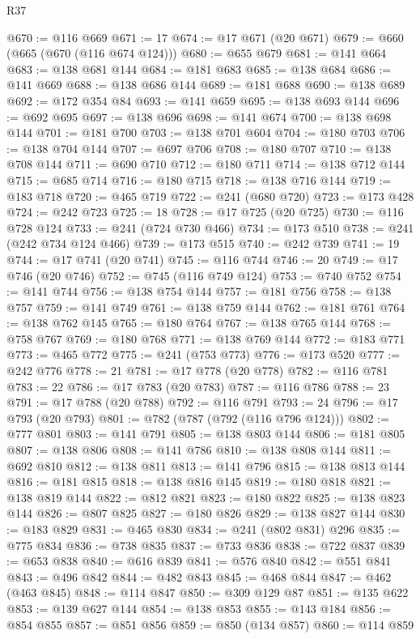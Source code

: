 \begin{lexlean}{R37}
\begin{coremodule}
@670 := @116 @669
@671 := 17
@674 := @17 @671 (@20 @671)
@679 := @660 (@665 (@670 (@116 @674 @124)))
@680 := @655 @679
@681 := @141 @664
@683 := @138 @681 @144
@684 := @181 @683
@685 := @138 @684
@686 := @141 @669
@688 := @138 @686 @144
@689 := @181 @688
@690 := @138 @689
@692 := @172 @354 @84
@693 := @141 @659
@695 := @138 @693 @144
@696 := @692 @695
@697 := @138 @696
@698 := @141 @674
@700 := @138 @698 @144
@701 := @181 @700
@703 := @138 @701 @604
@704 := @180 @703
@706 := @138 @704 @144
@707 := @697 @706
@708 := @180 @707
@710 := @138 @708 @144
@711 := @690 @710
@712 := @180 @711
@714 := @138 @712 @144
@715 := @685 @714
@716 := @180 @715
@718 := @138 @716 @144
@719 := @183 @718
@720 := @465 @719
@722 := @241 (@680 @720)
@723 := @173 @428
@724 := @242 @723
@725 := 18
@728 := @17 @725 (@20 @725)
@730 := @116 @728 @124
@733 := @241 (@724 @730 @466)
@734 := @173 @510
@738 := @241 (@242 @734 @124 @466)
@739 := @173 @515
@740 := @242 @739
@741 := 19
@744 := @17 @741 (@20 @741)
@745 := @116 @744
@746 := 20
@749 := @17 @746 (@20 @746)
@752 := @745 (@116 @749 @124)
@753 := @740 @752
@754 := @141 @744
@756 := @138 @754 @144
@757 := @181 @756
@758 := @138 @757
@759 := @141 @749
@761 := @138 @759 @144
@762 := @181 @761
@764 := @138 @762 @145
@765 := @180 @764
@767 := @138 @765 @144
@768 := @758 @767
@769 := @180 @768
@771 := @138 @769 @144
@772 := @183 @771
@773 := @465 @772
@775 := @241 (@753 @773)
@776 := @173 @520
@777 := @242 @776
@778 := 21
@781 := @17 @778 (@20 @778)
@782 := @116 @781
@783 := 22
@786 := @17 @783 (@20 @783)
@787 := @116 @786
@788 := 23
@791 := @17 @788 (@20 @788)
@792 := @116 @791
@793 := 24
@796 := @17 @793 (@20 @793)
@801 := @782 (@787 (@792 (@116 @796 @124)))
@802 := @777 @801
@803 := @141 @791
@805 := @138 @803 @144
@806 := @181 @805
@807 := @138 @806
@808 := @141 @786
@810 := @138 @808 @144
@811 := @692 @810
@812 := @138 @811
@813 := @141 @796
@815 := @138 @813 @144
@816 := @181 @815
@818 := @138 @816 @145
@819 := @180 @818
@821 := @138 @819 @144
@822 := @812 @821
@823 := @180 @822
@825 := @138 @823 @144
@826 := @807 @825
@827 := @180 @826
@829 := @138 @827 @144
@830 := @183 @829
@831 := @465 @830
@834 := @241 (@802 @831) @296
@835 := @775 @834
@836 := @738 @835
@837 := @733 @836
@838 := @722 @837
@839 := @653 @838
@840 := @616 @839
@841 := @576 @840
@842 := @551 @841
@843 := @496 @842
@844 := @482 @843
@845 := @468 @844
@847 := @462 (@463 @845)
@848 := @114 @847
@850 := @309 @129 @87
@851 := @135 @622
@853 := @139 @627 @144
@854 := @138 @853
@855 := @143 @184
@856 := @854 @855
@857 := @851 @856
@859 := @850 (@134 @857)
@860 := @114 @859

\end{coremodule}
\end{lexlean}
